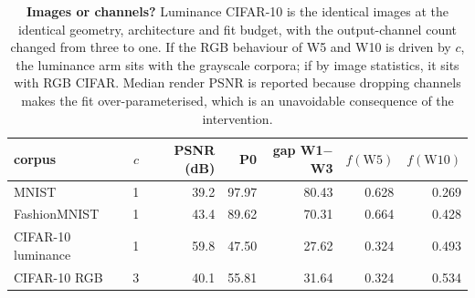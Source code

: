 \begin{table}[t]
\centering\small
\caption{\textbf{Images or channels?} Luminance CIFAR-10 is the identical images at the identical geometry, architecture and fit budget, with the output-channel count changed from three to one. If the RGB behaviour of W5 and W10 is driven by $c$, the luminance arm sits with the grayscale corpora; if by image statistics, it sits with RGB CIFAR. Median render PSNR is reported because dropping channels makes the fit over-parameterised, which is an unavoidable consequence of the intervention.}
\label{tab:gray}
\begin{tabular}{@{}lrrrrrr@{}}
\toprule
corpus & $c$ & PSNR (dB) & P0 & gap W1$-$W3 & $f(\mathrm{W5})$ & $f(\mathrm{W10})$ \\
\midrule
MNIST & 1 & 39.2 & 97.97 & 80.43 & 0.628 & 0.269 \\
FashionMNIST & 1 & 43.4 & 89.62 & 70.31 & 0.664 & 0.428 \\
CIFAR-10 luminance & 1 & 59.8 & 47.50 & 27.62 & 0.324 & 0.493 \\
CIFAR-10 RGB & 3 & 40.1 & 55.81 & 31.64 & 0.324 & 0.534 \\
\bottomrule
\end{tabular}
\end{table}
